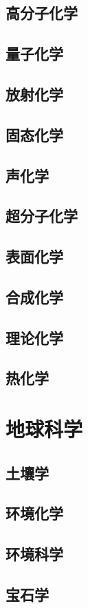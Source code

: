 \section{高分子化学}
\section{量子化学}
\section{放射化学}
\section{固态化学}
\section{声化学}
\section{超分子化学}
\section{表面化学}
\section{合成化学}
\section{理论化学}
\section{热化学}



\chapter{地球科学}    %
\section{土壤学}
\section{环境化学}
\section{环境科学}
\section{宝石学}
